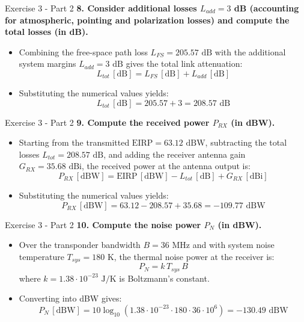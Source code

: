 \documentclass[10pt, aspectratio=169]{beamer}
\newcommand{\question}[1]{{\color{QuestionRed}\textbf{#1}}}
\begin{document}
	\begin{frame}{Exercise 3 - Part 2}
		\question{8. Consider additional losses $L_{add} = 3$ dB (accounting for atmospheric, pointing and polarization losses) and compute the total losses (in dB).}
		
		\vspace{0.1cm}
		\begin{itemize}
			\item Combining the free-space path loss $L_{FS} = 205.57\text{ dB}$ with the additional system margins $L_{add} = 3\text{ dB}$ gives the total link attenuation:
			\[
			L_{tot}\,[\text{dB}] = L_{FS}\,[\text{dB}] + L_{add}\,[\text{dB}]
			\]
			\item Substituting the numerical values yields:
			\[
			L_{tot}\,[\text{dB}] = 205.57 + 3 = 208.57\text{ dB}
			\]
		\end{itemize}
		
	\end{frame}
	
	\begin{frame}{Exercise 3 - Part 2}
		\question{9. Compute the received power $P_{RX}$ (in dBW).}
		
		\vspace{0.1cm}
		\begin{itemize}
			\item Starting from the transmitted $\text{EIRP} = 63.12\text{ dBW}$, subtracting the total losses $L_{tot} = 208.57\text{ dB}$, and adding the receiver antenna gain $G_{RX} = 35.68\text{ dBi}$, the received power at the antenna output is:
			\[
			P_{RX}\,[\text{dBW}] = \text{EIRP}\,[\text{dBW}] - L_{tot}\,[\text{dB}] + G_{RX}\,[\text{dBi}]
			\]
			\item Substituting the numerical values yields:
			\[
			P_{RX}\,[\text{dBW}] = 63.12 - 208.57 + 35.68 = -109.77\text{ dBW}
			\]
		\end{itemize}
		
	\end{frame}
	
	\begin{frame}{Exercise 3 - Part 2}
		\question{10. Compute the noise power $P_N$ (in dBW).}
		
		\vspace{0.1cm}
		\begin{itemize}
			\item Over the transponder bandwidth $B = 36\text{ MHz}$ and with system noise temperature $T_{sys} = 180\text{ K}$, the thermal noise power at the receiver is:
			\[
			P_N = k \, T_{sys} \, B
			\]
			where $k = 1.38 \cdot 10^{-23}\text{ J/K}$ is Boltzmann's constant.
			\item Converting into dBW gives:
			\[
			P_N\,[\text{dBW}] = 10\log_{10}\!\left(1.38 \cdot 10^{-23} \cdot 180 \cdot 36 \cdot 10^6\right) = -130.49\text{ dBW}
			\]
		\end{itemize}
		
	\end{frame}
	
\end{document}

